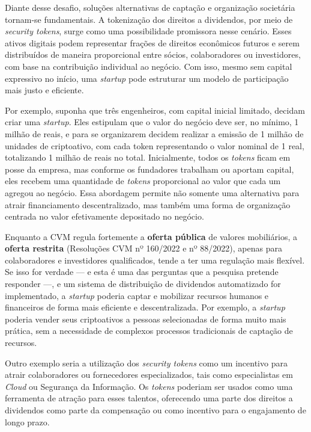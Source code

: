\documentclass[12pt, a4paper, oneside, openright, chapter=TITLE]{abntex2}
\begin{document}
Diante desse desafio, soluções alternativas de captação e organização societária tornam-se fundamentais. A tokenização dos direitos a dividendos, por meio de \textit{security tokens}, surge como uma possibilidade promissora nesse cenário. Esses ativos digitais podem representar frações de direitos econômicos futuros e serem distribuídos de maneira proporcional entre sócios, colaboradores ou investidores, com base na contribuição individual ao negócio. Com isso, mesmo sem capital expressivo no início, uma \textit{startup} pode estruturar um modelo de participação mais justo e eficiente.

Por exemplo, suponha que três engenheiros, com capital inicial limitado, decidam criar uma \textit{startup}. Eles estipulam que o valor do negócio deve ser, no mínimo, 1 milhão de reais, e para se organizarem decidem realizar a emissão de 1 milhão de unidades de criptoativo, com cada token representando o valor nominal de 1 real, totalizando 1 milhão de reais no total. Inicialmente, todos os \textit{tokens} ficam em posse da empresa, mas conforme os fundadores trabalham ou aportam capital, eles recebem uma quantidade de \textit{tokens} proporcional ao valor que cada um agregou ao negócio. Essa abordagem permite não somente uma alternativa para atrair financiamento descentralizado, mas também uma forma de organização centrada no valor efetivamente depositado no negócio.

Enquanto a CVM regula fortemente a \textbf{oferta pública} de valores mobiliários, a \textbf{oferta restrita} (Resoluções CVM nº 160/2022 e nº 88/2022), apenas para colaboradores e investidores qualificados, tende a ter uma regulação mais flexível. Se isso for verdade — e esta é uma das perguntas que a pesquisa pretende responder —, e um sistema de distribuição de dividendos automatizado for implementado, a \textit{startup} poderia captar e mobilizar recursos humanos e financeiros de forma mais eficiente e descentralizada. Por exemplo, a \textit{startup} poderia vender seus criptoativos a pessoas selecionadas de forma muito mais prática, sem a necessidade de complexos processos tradicionais de captação de recursos.

Outro exemplo seria a utilização dos \textit{security tokens} como um incentivo para atrair colaboradores ou fornecedores especializados, tais como especialistas em \textit{Cloud} ou Segurança da Informação. Os \textit{tokens} poderiam ser usados como uma ferramenta de atração para esses talentos, oferecendo uma parte dos direitos a dividendos como parte da compensação ou como incentivo para o engajamento de longo prazo.
\end{document}
